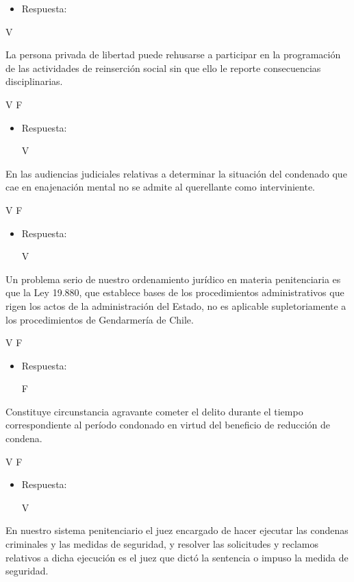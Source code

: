 \documentclass[letterpaper, 11pt]{article}
\begin{document}
\begin{itemize}
\item Respuesta:
\end{itemize}

V


La persona privada de libertad puede rehusarse a participar en la
programación de las actividades de reinserción social sin que ello le
reporte consecuencias disciplinarias.

V F

\begin{itemize}
\item Respuesta:

V
\end{itemize}

En las audiencias judiciales relativas a determinar la situación del
condenado que cae en enajenación mental no se admite al querellante
como interviniente.


V F

\begin{itemize}
\item Respuesta:

V
\end{itemize}

Un problema serio de nuestro ordenamiento jurídico en materia
penitenciaria es que la Ley 19.880, que establece bases de los
procedimientos administrativos que rigen los actos de la
administración del Estado, no es aplicable supletoriamente a los
procedimientos de Gendarmería de Chile.


V F

\begin{itemize}
\item Respuesta:

F
\end{itemize}


Constituye circunstancia agravante cometer el delito durante el tiempo
correspondiente al período condonado en virtud del beneficio de
reducción de condena.


V F

\begin{itemize}
\item Respuesta:

V
\end{itemize}

En nuestro sistema penitenciario el juez encargado de hacer ejecutar
las condenas criminales y las medidas de seguridad, y resolver las
solicitudes y reclamos relativos a dicha ejecución es el juez que
dictó la sentencia o impuso la medida de seguridad.
\end{document}
